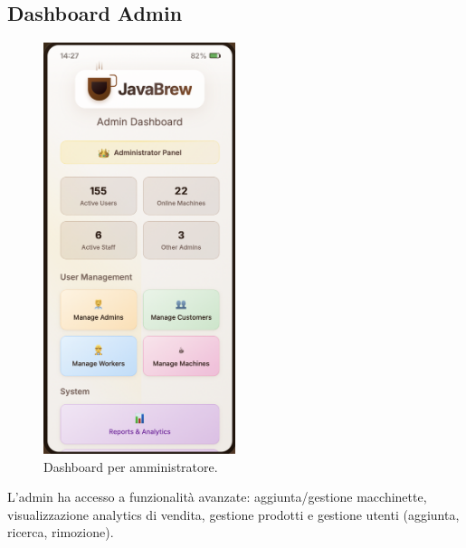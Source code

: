 \subsection{Dashboard Admin}
\begin{figure}[H]
    \centering
    \includegraphics[width=0.5\textwidth]{./assets/admin.png}
    \caption{Dashboard per amministratore.}
\end{figure}
L’admin ha accesso a funzionalità avanzate: aggiunta/gestione macchinette, visualizzazione analytics di vendita, gestione prodotti e gestione utenti (aggiunta, ricerca, rimozione).


